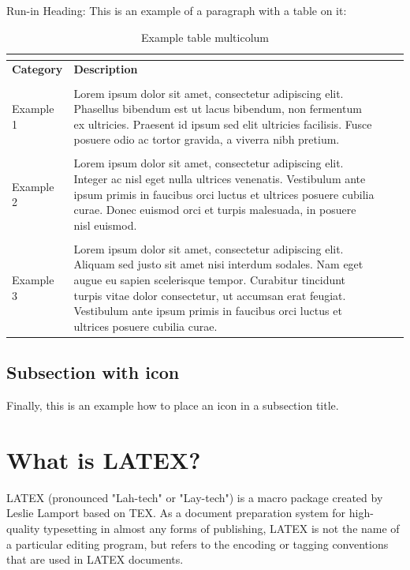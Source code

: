 \begin{paragraph}{Run-in Heading:}
This is an example of a paragraph with a table on it:
\begin{table}[htbp]
	\begin{center} {\footnotesize
			\begin{tabularx}{\textwidth}{@{} lXlX @{} }
				\multicolumn{2}{c}{} \\ 
				\hline
				
				\normalsize \textbf{Category} & \normalsize \textbf{Description} \\
				
				\hline
				& \\
				Example 1 & Lorem ipsum dolor sit amet, consectetur adipiscing elit. Phasellus bibendum est ut lacus bibendum, non fermentum ex ultricies. Praesent id ipsum sed elit ultricies facilisis. Fusce posuere odio ac tortor gravida, a viverra nibh pretium. \\
				& \\
				Example 2 & Lorem ipsum dolor sit amet, consectetur adipiscing elit. Integer ac nisl eget nulla ultrices venenatis. Vestibulum ante ipsum primis in faucibus orci luctus et ultrices posuere cubilia curae. Donec euismod orci et turpis malesuada, in posuere nisl euismod. \\
				& \\
				Example 3 & Lorem ipsum dolor sit amet, consectetur adipiscing elit. Aliquam sed justo sit amet nisi interdum sodales. Nam eget augue eu sapien scelerisque tempor. Curabitur tincidunt turpis vitae dolor consectetur, ut accumsan erat feugiat. Vestibulum ante ipsum primis in faucibus orci luctus et ultrices posuere cubilia curae. \\
				\hline
		\end{tabularx}}
	\end{center}
	\caption{\footnotesize Example table multicolum}
	\label{tab::example_table_multicolumn}
\end{table}
\end{paragraph}

\subsection{Subsection with icon }
Finally, this is an example how to place an icon in a subsection title.

\section{What is LATEX?}
LATEX (pronounced "Lah-tech" or "Lay-tech") is a macro package created by Leslie Lamport based on TEX. As a document preparation system for high-quality typesetting in almost any forms of publishing, LATEX is not the name of a particular editing program, but refers to the encoding or tagging conventions that are used in LATEX documents.

